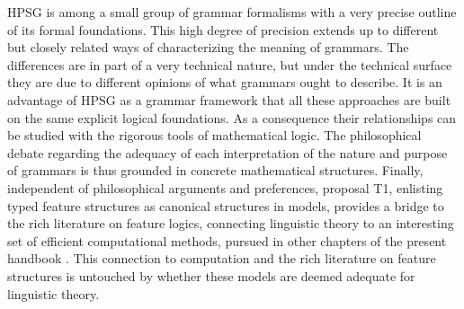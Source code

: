 \documentclass[output=paper
                ,modfonts
                ,nonflat
	        ,collection
	        ,collectionchapter
	        ,collectiontoclongg
 	        ,biblatex
                ,babelshorthands
                ,newtxmath
                ,draftmode
                ,colorlinks, citecolor=brown
]{./langsci/langscibook}
\begin{document}
{{HPSG is among a small group of grammar formalisms with a very precise
outline of its formal foundations. This high degree of precision
extends up to different but closely related ways of characterizing the
meaning of grammars. The differences are in part of a very technical nature,
but under the technical surface they are due to different opinions of
what grammars ought to describe. It is an advantage of HPSG as a
grammar framework that all these approaches are built on the same
explicit logical foundations. As a consequence their relationships can
be studied with the rigorous tools of mathematical logic. The
philosophical debate regarding the adequacy of each interpretation of
the nature and purpose of grammars is thus grounded in concrete
mathematical structures. Finally, independent of 
philosophical arguments and preferences, proposal T1, enlisting typed feature
structures as canonical structures in models, provides a bridge to the
rich literature on feature logics, connecting linguistic theory to an
interesting set of efficient computational methods, pursued in other
chapters of the present handbook . This connection
to computation and the rich literature on feature structures is untouched
by whether these models are deemed adequate for linguistic theory.




}




}
\end{document}
